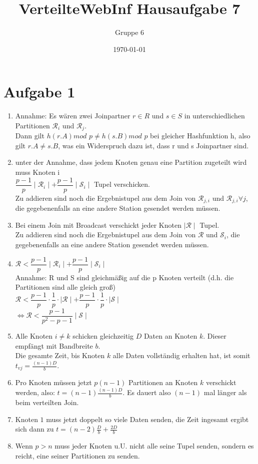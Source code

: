 \documentclass[a4paper]{article}
\author{Gruppe 6}
\title{\textbf{VerteilteWebInf Hausaufgabe 7}}
\date{\today}
\begin{document}
\maketitle


\section*{Aufgabe 1}
\begin{enumerate}[label=\alph*)]
\item Annahme: Es wären zwei Joinpartner $ r \in R $ und $ s \in S $ in unterschiedlichen Partitionen $ \mathcal{R}_i $ und $ \mathcal{R}_j $.\\
Dann gilt $ h(r.A) mod $  $p \neq h(s.B) mod $  $ p $ bei gleicher Hashfunktion h, also gilt $ r.A \neq s.B $, was ein Widerspruch dazu ist, dass r und s Joinpartner sind. 
\item unter der Annahme, dass jedem Knoten genau eine Partition zugeteilt wird muss Knoten i \\
$ \dfrac{p-1}{p} \mid \mathcal{R}_i \mid + \dfrac{p-1}{p} \mid \mathcal{S}_i \mid $ Tupel verschicken.\\
Zu addieren sind noch die Ergebnistupel aus dem Join von $ \mathcal{R}_{j,i} $ und $ \mathcal{R}_{j,i} \forall j$, die gegebenenfalls an eine andere Station gesendet werden müssen.
\item Bei einem Join mit Broadcast verschickt jeder Knoten $ \mid \mathcal{R} \mid $ Tupel.\\
Zu addieren sind noch die Ergebnistupel aus dem Join von $ \mathcal{R} $ und $ \mathcal{S}_{i} $, die gegebenenfalls an eine andere Station gesendet werden müssen.
\item $ \mathcal{R} < \dfrac{p-1}{p} \mid \mathcal{R}_i \mid + \dfrac{p-1}{p} \mid \mathcal{S}_i \mid $\\
Annahme: R und S sind gleichmäßig auf die p Knoten verteilt (d.h. die Partitionen sind alle gleich groß)\\
$ \mathcal{R} < \dfrac{p-1}{p} \cdot \dfrac{1}{p} \cdot \mid \mathcal{R} \mid + \dfrac{p-1}{p} \cdot \dfrac{1}{p} \cdot \mid \mathcal{S} \mid $\\
$ \Longleftrightarrow \mathcal{R} < \dfrac{p-1}{p^2-p-1} \mid \mathcal{S} \mid $
\item Alle Knoten $i\neq k$ schicken gleichzeitig $D$ Daten an Knoten $k$. Dieser empfängt mit Bandbreite $b$.\\
Die gesamte Zeit, bis Knoten $k$ alle Daten vollständig erhalten hat, ist somit $t_{vj} = \frac{(n-1)D}{b}$.
\item Pro Knoten müssen jetzt $p(n-1)$ Partitionen an Knoten $k$ verschickt werden, also: $t=(n-1)\frac{(n-1)D}{b}$. Es dauert also $(n-1)$ mal länger als beim verteilten Join.\\
\item Knoten $1$ muss jetzt doppelt so viele Daten senden, die Zeit ingesamt ergibt sich dann zu $t=(n-2)\frac{D}{b} + \frac{2D}{b}$
\item Wenn $p>n$ muss jeder Knoten u.U. nicht alle seine Tupel senden, sondern es reicht, eine seiner Partitionen zu senden.
\end{enumerate}
\end{document}
